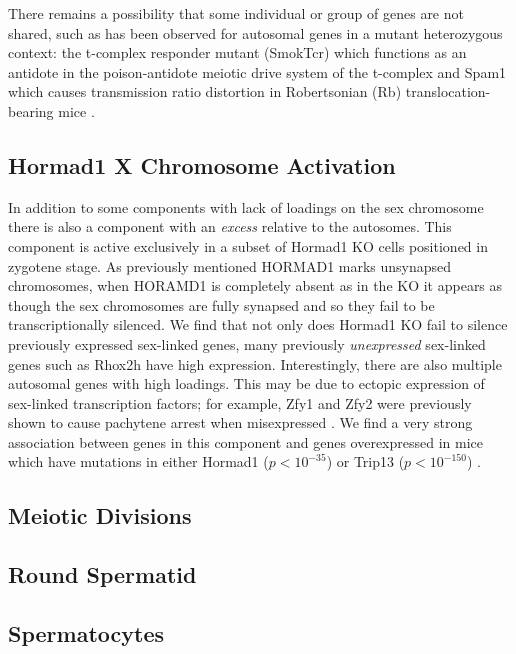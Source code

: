 There remains a possibility that some individual or group of genes are not shared, such as has been observed for autosomal genes in a mutant heterozygous context: the t-complex responder mutant (SmokTcr) which functions as an antidote in the poison-antidote meiotic drive system of the t-complex \cite{Veron2009Retention} and Spam1 which causes transmission ratio distortion in Robertsonian (Rb) translocation-bearing mice \cite{Martin-DeLeon2005Spam1associated}.


\subsection{Hormad1 X Chromosome Activation}
In addition to some components with lack of loadings on the sex chromosome there is also a component with an \textit{excess} relative to the autosomes. This component is active exclusively in a subset of Hormad1 KO cells positioned in zygotene stage. As previously mentioned HORMAD1 marks unsynapsed chromosomes, when HORAMD1 is completely absent as in the KO it appears as though the sex chromosomes are fully synapsed and so they fail to be transcriptionally silenced. We find that not only does Hormad1 KO fail to silence previously expressed sex-linked genes, many previously \textit{unexpressed} sex-linked genes such as Rhox2h have high expression. Interestingly, there are also multiple autosomal genes with high loadings. This may be due to ectopic expression of sex-linked transcription factors; for example, Zfy1 and Zfy2 were previously shown to cause pachytene arrest when misexpressed \cite{Royo2010Evidence}. We find a very strong association between genes in this component and genes overexpressed in mice which have mutations in either Hormad1 ($p<10^{-35}$) or Trip13 ($p<10^{-150}$) \cite{Ortega2016Surveillance}.


\subsection{Meiotic Divisions}

\subsection{Round Spermatid}

\subsection{Spermatocytes}


